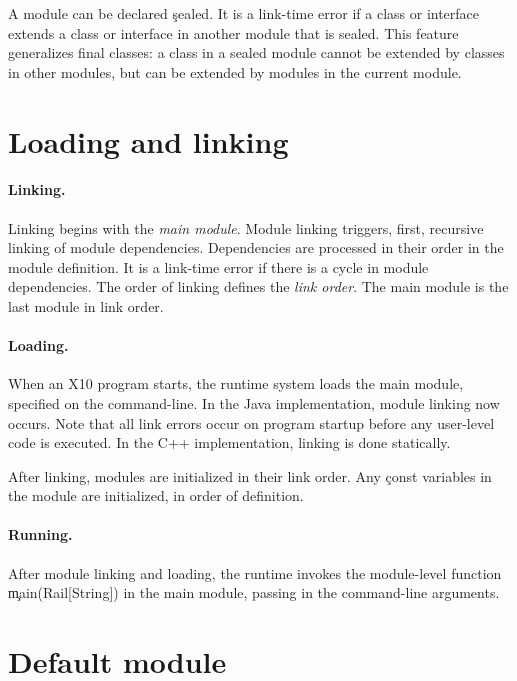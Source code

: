\documentclass{article}
\newcommand\Xten{{\sf X10}\xspace}
\begin{document}
A module can be declared \c{sealed}.  It is a link-time error if a class or
interface extends a class or interface in another module that is sealed.
This feature generalizes final classes: a class in a sealed module 
cannot be extended by classes in other modules, but can be extended by modules
in the current module.

\section{Loading and linking}

\paragraph{Linking.}

Linking begins with the \emph{main module}.  Module linking triggers, first,
recursive linking of module dependencies.
Dependencies are
processed in their order in the module definition.  It is a link-time error if
there is a cycle in module dependencies.  The order of linking defines the
\emph{link order}.  The main module is the last module in link order.

\paragraph{Loading.}

When an \Xten program starts, the runtime system loads the main module,
specified on the command-line.  In the Java implementation, module linking
now occurs.  Note that all link errors occur on program startup before any
user-level code is executed.  In the C++ implementation, linking is done
statically.

After linking, modules are initialized in their link order.
Any \c{const}
variables in the module are initialized, in order of definition.

\paragraph{Running.}

After module linking and loading, the runtime invokes the module-level
function \c{main(Rail[String])} in the main module, passing in the
command-line arguments.

\section{Default module}
\end{document}
